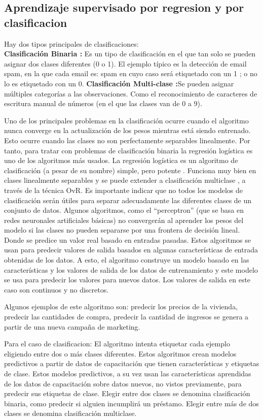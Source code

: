 \documentclass[%
 reprint,
 amsmath,amssymb,
 aps,
]{revtex4-1}
\begin{document}
{\subsection{Aprendizaje supervisado por regresion y por clasificacion}
Hay dos tipos principales de clasificaciones:\\

 \textbf{Clasificación Binaria :} Es un tipo de clasificación en el que tan solo se pueden asignar dos clases diferentes (0 o 1). El ejemplo típico es la detección de email spam, en la que cada email es: spam  en cuyo caso será etiquetado con un 1 ; o no lo es  etiquetado con un 0.
  \textbf{Clasificación Multi-clase :}Se pueden asignar múltiples categorías a las observaciones. Como el reconocimiento de caracteres de escritura manual de números (en el que las clases van de 0 a 9).
  
  Uno de los principales problemas en la clasificación ocurre cuando el algoritmo nunca converge en la actualización de los pesos mientras está siendo entrenado.
Esto ocurre cuando las clases no son perfectamente separables linealmente. Por tanto, para tratar con problemas de clasificación binaria la regresión logística es uno de los algoritmos más usados.
La regresión logística es un algoritmo de clasificación (a pesar de su nombre) simple, pero potente . Funciona muy bien en clases linealmente separables y se puede extender a clasificación multiclase , a través de la técnica OvR.
Es importante indicar que no todos los modelos de clasificación serán útiles para separar adecuadamente las diferentes clases de un conjunto de datos. Algunos algoritmos, como el “perceptron” (que se basa en redes neuronales artificiales básicas) no convergerán al aprender los pesos del modelo si las clases no pueden separarse por una frontera de decisión lineal.
Donde se predice un valor real basado en entradas pasadas. Estos algoritmos se usan para predecir valores de salida basados en algunas características de entrada obtenidas de los datos. A esto, el algoritmo construye un modelo basado en las características y los valores de salida de los datos de entrenamiento y este modelo se usa para predecir los valores para nuevos datos. Los valores de salida en este caso son continuos y no discretos.

Algunos ejemplos de este algoritmo son: predecir los precios de la vivienda, predecir las cantidades de compra, predecir la cantidad de ingresos se genera a partir de una nueva campaña de marketing.

Para el caso de clasificacion:
El algoritmo intenta etiquetar cada ejemplo eligiendo entre dos o más clases diferentes. Estos algoritmos crean modelos predictivos a partir de datos de capacitación que tienen características y etiquetas de clase. Estos modelos predictivos, a su vez usan las características aprendidas de los datos de capacitación sobre datos nuevos, no vistos previamente, para predecir sus etiquetas de clase. Elegir entre dos clases se denomina clasificación binaria, como predecir si alguien incumplirá un préstamo. Elegir entre más de dos clases se denomina clasificación multiclase.

}
\end{document}
